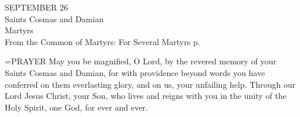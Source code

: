 \begin{center}\normalsize SEPTEMBER 26\\
\footnotesize Saints Cosmas and Damian\\
\footnotesize Martyrs\\
\footnotesize From the Common of Martyrs: For Several Martyrs p.\\
\end{center}

\hangindent=\parindent \small{PRAYER 
May you be magnified, O Lord,
by the revered memory of your Saints Cosmas and Damian,
for with providence beyond words
you have conferred on them everlasting glory,
and on us, your unfailing help.
Through our Lord Jesus Christ, your Son,
who lives and reigns with you in the unity of the Holy Spirit,
one God, for ever and ever.\\}
 

